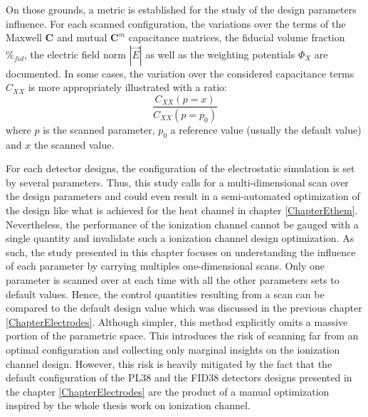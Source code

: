 On those grounds, a metric is established for the study of the design parameters influence. For each scanned configuration, the variations over the terms of the Maxwell $\bm{C}$ and mutual $\bm{C}^m$ capacitance matrices, the fiducial volume fraction $\%_{fid}$, the electric field norm $|\vec{E}|$ as well as the weighting potentials $\Phi_X$ are documented. In some cases, the variation over the considered capacitance terms $C_{XX}$ is more appropriately illustrated with a ratio:
\begin{equation}
\frac{C_{XX}\left(p=x\right)}{C_{XX}\left(p=p_0\right)}
\end{equation}
where $p$ is the scanned parameter, $p_0$ a reference value (usually the default value) and $x$ the scanned value. 

For each detector designs, the configuration of the electrostatic simulation is set by several parameters. Thus, this study calls for a multi-dimensional scan over the design parameters and could even result in a semi-automated optimization of the design like what is achieved for the heat channel in chapter \ref{ChapterEthem}. Nevertheless, the performance of the ionization channel cannot be gauged with a single quantity and invalidate such a ionization channel design optimization. As such, the study presented in this chapter focuses on understanding the influence of each parameter by carrying multiples one-dimensional scans. Only one parameter is scanned over at each time with all the other parameters sets to default values. Hence, the control quantities resulting from a scan can be compared to the default design value which was discussed in the previous chapter \ref{ChapterElectrodes}.
Although simpler, this method explicitly omits a massive portion of the parametric space. This introduces the risk of scanning far from an optimal configuration and collecting only marginal insights on the ionization channel design. However, this risk is heavily mitigated by the fact that the default configuration of the PL38 and the FID38 detectors designs presented in the chapter \ref{ChapterElectrodes} are the product of a manual optimization inspired by the whole thesis work on ionization channel.


